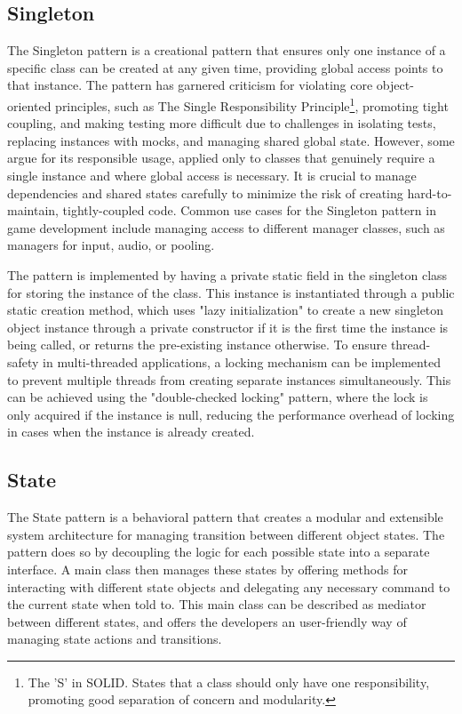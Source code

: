 \subsection{Singleton}
    The Singleton pattern is a creational pattern that ensures only one instance of a specific class can be created at any given time, providing global access points to that instance. The pattern has garnered criticism for violating core object-oriented principles, such as The Single Responsibility Principle\footnote{The 'S' in SOLID. States that a class should only have one responsibility, promoting good separation of concern and modularity.}, promoting tight coupling, and making testing more difficult due to challenges in isolating tests, replacing instances with mocks, and managing shared global state. However, some argue for its responsible usage, applied only to classes that genuinely require a single instance and where global access is necessary. It is crucial to manage dependencies and shared states carefully to minimize the risk of creating hard-to-maintain, tightly-coupled code. Common use cases for the Singleton pattern in game development include managing access to different manager classes, such as managers for input, audio, or pooling.

    The pattern is implemented by having a private static field in the singleton class for storing the instance of the class. This instance is instantiated through a public static creation method, which uses "lazy initialization" to create a new singleton object instance through a private constructor if it is the first time the instance is being called, or returns the pre-existing instance otherwise. To ensure thread-safety in multi-threaded applications, a locking mechanism can be implemented to prevent multiple threads from creating separate instances simultaneously. This can be achieved using the "double-checked locking" pattern, where the lock is only acquired if the instance is null, reducing the performance overhead of locking in cases when the instance is already created.

\subsection{State}
    The State pattern is a behavioral pattern that creates a modular and extensible system architecture for managing transition between different object states. The pattern does so by decoupling the logic for each possible state into a separate interface. A main class then manages these states by offering methods for interacting with different state objects and delegating any necessary command to the current state when told to. This main class can be described as mediator between different states, and offers the developers an user-friendly way of managing state actions and transitions.

